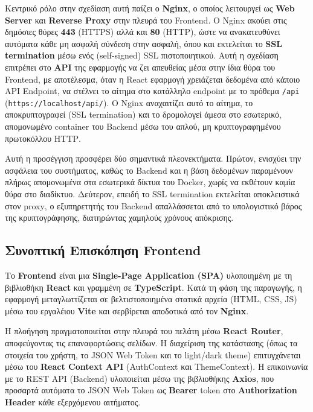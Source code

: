 \documentclass[12pt]{fphw}
\newcommand{\en}[1]{\foreignlanguage{english}{#1}}
\begin{document}
Κεντρικό ρόλο στην σχεδίαση αυτή παίζει ο \textbf{Nginx}, ο οποίος λειτουργεί ως \textbf{Web Server} και \textbf{Reverse Proxy} στην πλευρά του \en{Frontend}. Ο Nginx ακούει στις δημόσιες θύρες \textbf{443} (HTTPS) αλλά και \textbf{80} (HTTP), ώστε να ανακατευθύνει αυτόματα κάθε μη ασφαλή σύνδεση στην ασφαλή, όπου και εκτελείται το \textbf{SSL termination} μέσω ενός (\en{self-signed}) SSL πιστοποιητικού. Αυτή η σχεδίαση επιτρέπει στο \textbf{API} της εφαρμογής να ζει απευθείας μέσα στην ίδια θύρα του \en{Frontend}, με αποτέλεσμα, όταν η \en{React} εφαρμογή χρειάζεται δεδομένα από κάποιο \en{API Endpoint}, να στέλνει το αίτημα στο κατάλληλο endpoint με το πρόθεμα \en{\texttt{/api}} (\en{\texttt{https://localhost/api/}}). Ο \en{Nginx} αναχαιτίζει αυτό το αίτημα, το αποκρυπτογραφεί (\en{SSL termination}) και το δρομολογεί άμεσα στο εσωτερικό, απομονωμένο \en{container} του \en{Backend} μέσω του απλού, μη κρυπτογραφημένου πρωτοκόλλου \en{HTTP}.

Αυτή η προσέγγιση προσφέρει δύο σημαντικά πλεονεκτήματα. Πρώτον, ενισχύει την ασφάλεια του συστήματος, καθώς το \en{Backend} και η βάση δεδομένων παραμένουν πλήρως απομονωμένα στα εσωτερικά δίκτυα του \en{Docker}, χωρίς να εκθέτουν καμία θύρα στο διαδίκτυο. Δεύτερον, επειδή το \en{SSL termination} εκτελείται αποκλειστικά στον \en{proxy}, ο εξυπηρετητής του \en{Backend} απαλλάσσεται από το υπολογιστικό βάρος της κρυπτογράφησης, διατηρώντας χαμηλούς χρόνους απόκρισης.


\subsection{Συνοπτική Επισκόπηση Frontend}
Το \en{\textbf{Frontend}} είναι μια \en{\textbf{Single-Page Application (SPA)}} υλοποιημένη με τη βιβλιοθήκη \en{\textbf{React}} και γραμμένη σε \en{\textbf{TypeScript}}. Κατά τη φάση της παραγωγής, η εφαρμογή μεταγλωττίζεται σε βελτιστοποιημένα στατικά αρχεία (\en{HTML, CSS, JS}) μέσω του εργαλέιου \en{\textbf{Vite}} και σερβίρεται αποδοτικά από τον \en{\textbf{Nginx}}.

Η πλοήγηση πραγματοποιείται στην πλευρά του πελάτη μέσω \en{\textbf{React Router}}, αποφεύγοντας τις επαναφορτώσεις σελίδων. Η διαχείριση της κατάστασης (όπως τα στοιχεία του χρήστη, το \en{JSON Web Token} και το \en{light/dark theme}) επιτυγχάνεται μέσω του \en{\textbf{React Context API}} (\en{AuthContext} και \en{ThemeContext}). Η επικοινωνία με το REST API (\en{Backend}) υλοποιείται μέσω της βιβλιοθήκης \en{\textbf{Axios}}, που προσαρτά αυτόματα το \en{JSON Web Token} ως \en{\textbf{Bearer} token} στο \en{\textbf{Authorization Header}} κάθε εξερχόμενου αιτήματος.
\end{document}
